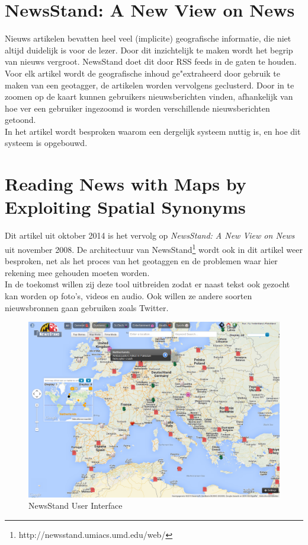 \documentclass[twoside,openright]{uva-bachelor-thesis}
\begin{document}
	\section{NewsStand: A New View on News \cite{NewsStand2008}}
		Nieuws artikelen bevatten heel veel (implicite) geografische informatie, die niet altijd duidelijk is voor de lezer. Door dit inzichtelijk te maken wordt het begrip van nieuws vergroot. NewsStand doet dit door RSS feeds \cite{RSS} in de gaten te houden. Voor elk artikel wordt de geografische inhoud ge"extraheerd door gebruik te maken van een geotagger, de artikelen worden vervolgens geclusterd. Door in te zoomen op de kaart kunnen gebruikers nieuwsberichten vinden, afhankelijk van hoe ver een gebruiker ingezoomd is worden verschillende nieuwsberichten getoond.
		\\[0.5cm]
		In het artikel wordt besproken waarom een dergelijk systeem nuttig is, en hoe dit systeem is opgebouwd.
	\section{Reading News with Maps by Exploiting Spatial Synonyms \cite{RNwMbESS}}
		Dit artikel uit oktober 2014 is het vervolg op \textit{NewsStand: A New View on News} uit november 2008. De architectuur van NewsStand\footnote{http://newsstand.umiacs.umd.edu/web/} wordt ook in dit artikel weer besproken, net als het proces van het geotaggen en de problemen waar hier rekening mee gehouden moeten worden.
		\\[0.5cm]
		In de toekomst willen zij deze tool uitbreiden zodat er naast tekst ook gezocht kan worden op foto's, videos en audio. Ook willen ze andere soorten nieuwsbronnen gaan gebruiken zoals Twitter.
		\begin{figure}[!htb]
			\centering
			\includegraphics[scale=0.3]{./img/NewsStand.png}
			\caption{NewsStand User Interface}
		\end{figure}
\end{document}

